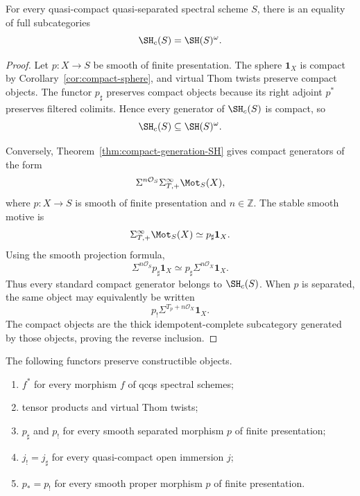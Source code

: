 \begin{theorem}
\label{thm:constructible-equals-compact}
For every quasi-compact quasi-separated spectral scheme \(S\), there is an
equality of full subcategories
\[
    \SH_c(S)
    =
    \SH(S)^\omega.
\]
\end{theorem}

\begin{proof}
Let \(p:X\to S\) be smooth of finite presentation.  The sphere
\(\mathbf1_X\) is compact by Corollary~\ref{cor:compact-sphere}, and virtual
Thom twists preserve compact objects.  The functor \(p_\sharp\) preserves
compact objects because its right adjoint \(p^*\) preserves filtered
colimits.  Hence every generator of \(\SH_c(S)\) is compact, so
\[
    \SH_c(S)
    \subseteq
    \SH(S)^\omega.
\]

Conversely, Theorem~\ref{thm:compact-generation-SH} gives compact generators
of the form
\[
    \Sigma^{n\mathcal O_S}
    \Sigma_{T,+}^{\infty}\Mot_S(X),
\]
where \(p:X\to S\) is smooth of finite presentation and \(n\in\mathbb Z\).
The stable smooth motive is
\[
    \Sigma_{T,+}^{\infty}\Mot_S(X)
    \simeq
    p_\sharp\mathbf1_X.
\]
Using the smooth projection formula,
\[
    \Sigma^{n\mathcal O_S}p_\sharp\mathbf1_X
    \simeq
    p_\sharp\Sigma^{n\mathcal O_X}\mathbf1_X.
\]
Thus every standard compact generator belongs to \(\SH_c(S)\).  When
\(p\) is separated, the same object may equivalently be written
\[
    p_!\Sigma^{T_p+n\mathcal O_X}\mathbf1_X.
\]  The compact
objects are the thick idempotent-complete subcategory generated by those
objects, proving the reverse inclusion.
\end{proof}

\begin{proposition}
\label{prop:formal-constructible-preservation}
The following functors preserve constructible objects.
\begin{enumerate}
    \item \(f^*\) for every morphism \(f\) of qcqs spectral schemes;

    \item tensor products and virtual Thom twists;

    \item \(p_\sharp\) and \(p_!\) for every smooth separated morphism
    \(p\) of finite presentation;

    \item \(j_!=j_\sharp\) for every quasi-compact open immersion \(j\);

    \item \(p_*=p_!\) for every smooth proper morphism \(p\) of finite
    presentation.
\end{enumerate}
\end{proposition}

